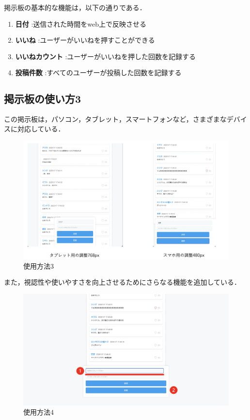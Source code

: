 \documentclass[uplatex,dvipdfmx]{jsarticle}
\begin{document}
掲示板の基本的な機能は，以下の通りである．
\begin{enumerate}
    \item \textbf{日付} :送信された時間をweb上で反映させる
    \item \textbf{いいね} :ユーザーがいいねを押すことができる
    \item \textbf{いいねカウント} :ユーザーがいいねを押した回数を記録する
    \item \textbf{投稿件数} :すべてのユーザーが投稿した回数を記録する
\end{enumerate}

\subsection{掲示板の使い方3}
この掲示板は，パソコン，タブレット，スマートフォンなど，さまざまなデバイスに対応している．
\clearpage
\begin{figure}[h]
    \centering
    \includegraphics[width=14cm]{使用者4.png}
    \caption{使用方法3}
    \label{fig:使用者3}
\end{figure}

また，視認性や使いやすさを向上させるためにさらなる機能を追加している．

\begin{figure}[h]
    \centering
    \includegraphics[width=14cm]{使用者5.png}
    \caption{使用方法4}
    \label{fig:使用者4}
\end{figure}
\end{document}
